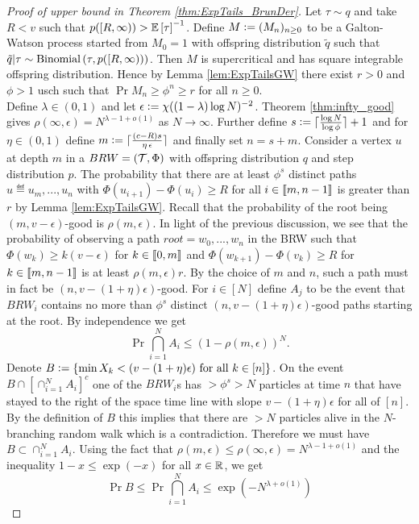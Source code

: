 \begin{proof}[Proof of upper bound in Theorem \ref{thm:ExpTails_BrunDer}]
Let $\tau \sim q$ and take $R < v$ such that $p([R, \infty)) > \Ex{\tau}^{-1}$. Define $M \defeq (M_n)_{n \geq 0}$ to be a Galton-Watson process started from $M_0 = 1$ with offspring distribution $\tilde{q}$ such that $\tilde{q} | \tau \sim \dBin{\tau}{p([R, \infty))}$. Then $M$ is supercritical and has square integrable offspring distribution. Hence by Lemma \ref{lem:ExpTailsGW} there exist $r > 0$ and $\phi > 1$ usch such that $\Pr{M_n \geq \phi^n} \geq r$ for all $n \geq 0$. \\

Define $\lambda \in (0,1)$ and let $\epsilon \defeq \chi ((1-\lambda)\log N)^{-2}$. Theorem \ref{thm:infty_good} gives $\rho(\infty, \epsilon) = N^{\lambda - 1 + o(1)}$ as $N \to \infty$. Further define $s \defeq \ceil{\frac{\log N}{\log \phi}} + 1$ and for $\eta \in (0,1)$ define $m \defeq \ceil{\frac{(c - R)s}{\eta\, \epsilon}}$ and finally set $n = s + m$. Consider a vertex $u$ at depth $m$ in a $BRW=(\cal{T}, \Phi)$ with offspring distribution $q$ and step distribution $p$. The probability that there are at least $\phi^s$ distinct paths $u \eqdef u_m, ..., u_n$ with $\Phi(u_{i+1}) - \Phi(u_i) \geq R$ for all $i \in \bbracket{m, n - 1}$ is greater than $r$ by Lemma \ref{lem:ExpTailsGW}. Recall that the probability of the root being $(m, v - \epsilon)$-good is $\rho(m, \epsilon)$. In light of the previous discussion, we see that the probability of observing a path $root = w_0, ..., w_n$ in the BRW such that $\Phi(w_k) \geq k (v - \epsilon)$ for $k \in \bbracket{0, m}$ and $\Phi(w_{k+1}) - \Phi(v_k) \geq R$ for $k \in \bbracket{m, n-1}$ is at least $\rho(m, \epsilon) r$. By the choice of $m$ and $n$, such a path must in fact be $(n, v - (1+\eta)\epsilon)$-good. For $i \in [N]$ define $A_j$ to be the event that $BRW_i$ contains no more than $\phi^s$ distinct $(n, v - (1+\eta)\epsilon)$-good paths starting at the root. By independence we get
\begin{equation}
\Pr{\bigcap\limits_{i=1}^N A_i} \leq (1 - \rho(m, \epsilon))^N. 
\end{equation}
Denote $B \defeq \{ \min X_k < (v - (1+\eta)\epsilon) \text{ for all } k \in [n]\}$. On the event $B \cap [\cap_{i=1}^N A_i]^c$ one of the $BRW_i$s has $> \phi^s > N$ particles at time $n$ that have stayed to the right of the space time line with slope $v - (1 + \eta)\epsilon$ for all of $[n]$. By the definition of $B$ this implies that there are $> N$ particles alive in the $N$-branching random walk which is a contradiction. Therefore we must have $B \subset \cap_{i=1}^N A_i$. Using the fact that $\rho(m, \epsilon) \leq \rho(\infty, \epsilon) = N^{\lambda - 1 + o(1)}$ and the inequality $1 - x \leq \exp(-x)$ for all $x \in \R$, we get
\begin{equation}\label{eqn:ExpTailsBBound}
\Pr{B} \leq \Pr{\bigcap\limits_{i=1}^N A_i} \leq \exp(-N^{\lambda + o(1)})
\end{equation}


\end{proof}
